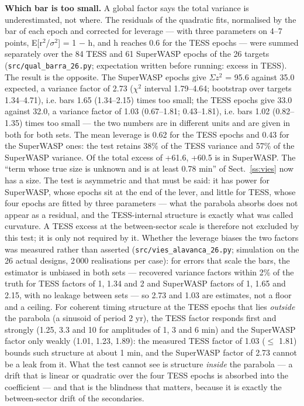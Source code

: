 \documentclass{aa}
\begin{document}
\textbf{Which bar is too small.} A global factor says the total variance is underestimated, not where. The residuals of the quadratic fits, normalised by the bar of each epoch and corrected for leverage --- with three parameters on 4--7 points, E[r$^2$/$\sigma^2$] = 1 $-$ h, and h reaches 0.6 for the TESS epochs --- were summed separately over the 84 TESS and 61 SuperWASP epochs of the 26 targets (\texttt{src/qual\_barra\_26.py}; expectation written before running: excess in TESS). The result is the opposite. The SuperWASP epochs give $\Sigma z^2$ = 95.6 against 35.0 expected, a variance factor of 2.73 ($\chi^2$ interval 1.79--4.64; bootstrap over targets 1.34--4.71), i.e. bars 1.65 (1.34--2.15) times too small; the TESS epochs give 33.0 against 32.0, a variance factor of 1.03 (0.67--1.81; 0.43--1.81), i.e. bars 1.02 (0.82--1.35) times too small --- the two numbers are in different units and are given in both for both sets. The mean leverage is 0.62 for the TESS epochs and 0.43 for the SuperWASP ones: the test retains 38\% of the TESS variance and 57\% of the SuperWASP variance. Of the total excess of +61.6, +60.5 is in SuperWASP. The ``term whose true size is unknown and is at least 0.78 min'' of Sect.~\ref{ss:vies} now has a size. The test is asymmetric and that must be said: it has power for SuperWASP, whose epochs sit at the end of the lever, and little for TESS, whose four epochs are fitted by three parameters --- what the parabola absorbs does not appear as a residual, and the TESS-internal structure is exactly what was called curvature. A TESS excess at the between-sector scale is therefore not excluded by this test; it is only not required by it. Whether the leverage biases the two factors was measured rather than asserted (\texttt{src/vies\_alavanca\_26.py}; simulation on the 26 actual designs, 2\,000 realisations per case): for errors that scale the bars, the estimator is unbiased in both sets --- recovered variance factors within 2\% of the truth for TESS factors of 1, 1.34 and 2 and SuperWASP factors of 1, 1.65 and 2.15, with no leakage between sets --- so 2.73 and 1.03 are estimates, not a floor and a ceiling. For coherent timing structure at the TESS epochs that lies \emph{outside} the parabola (a sinusoid of period 2 yr), the TESS factor responds first and strongly (1.25, 3.3 and 10 for amplitudes of 1, 3 and 6 min) and the SuperWASP factor only weakly (1.01, 1.23, 1.89): the measured TESS factor of 1.03 ($\le$ 1.81) bounds such structure at about 1 min, and the SuperWASP factor of 2.73 cannot be a leak from it. What the test cannot see is structure \emph{inside} the parabola --- a drift that is linear or quadratic over the four TESS epochs is absorbed into the coefficient --- and that is the blindness that matters, because it is exactly the between-sector drift of the secondaries.
\end{document}

